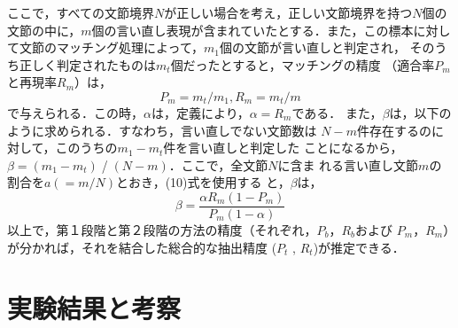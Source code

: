 ここで，すべての文節境界$N$が正しい場合を考え，正しい文節境界を持つ$N$個の
文節の中に，$m$個の言い直し表現が含まれていたとする．また，この標本に対し
て文節のマッチング処理によって，$m_1$個の文節が言い直しと判定され，
そのうち正しく判定されたものは$m_t$個だったとすると，マッチングの精度
（適合率$P_m$と再現率$R_m$）は，
\begin{equation}
 P_m = m_t  / m_1 , R_m = m_t  / m
\end{equation}
で与えられる．この時，$\alpha$は，定義により，$\alpha=R_m$である．
また，$\beta$は，以下のように求められる．すなわち，言い直しでない文節数は
$N-m$件存在するのに対して，このうちの$m_1-m_t$件を言い直しと判定した
ことになるから，$\beta=(m_1 - m_t)\;$/$\;(N - m)$．ここで，全文節$N$に含ま
れる言い直し文節$m$の割合を$a(=m/N)$とおき，(10)式を使用する
と，$\beta$は，
\begin{equation}
 \beta ={} \frac{\alpha R_m (1-P_m)} {P_m (1- \alpha)}
\end{equation}
以上で，第１段階と第２段階の方法の精度（それぞれ，$P_b$，$R_b$および
$P_m$，$R_m$）が分かれば，それを結合した総合的な抽出精度
($P_t$ , $R_t$)が推定できる．

\section{実験結果と考察}
